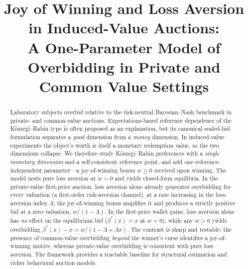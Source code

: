 \documentclass[11pt,a4paper]{article}
\title{\textbf{Joy of Winning and Loss Aversion in Induced-Value Auctions:\\
A One-Parameter Model of Overbidding in Private and Common Value Settings}}
\author{}
\date{}
\theoremstyle{remark}
\begin{document}
\maketitle
\begin{abstract}
\noindent
Laboratory subjects overbid relative to the risk-neutral Bayesian--Nash benchmark
in private- and common-value auctions. Expectations-based reference dependence of
the K\H{o}szegi--Rabin type is often proposed as an explanation, but its canonical
sealed-bid formulation separates a \emph{good} dimension from a \emph{money}
dimension. In induced-value experiments the object's worth is itself a monetary
redemption value, so the two dimensions collapse. We therefore study
K\H{o}szegi--Rabin preferences with a \emph{single monetary dimension} and a
self-consistent reference point, and add one reference-independent
parameter---a joy-of-winning bonus $w\ge0$ received upon winning. The model nests
pure loss aversion at $w=0$ and yields closed-form equilibria. In the private-value
first-price auction, loss aversion alone already generates overbidding for every
valuation (a first-order risk-aversion channel), at a rate increasing in the
loss-aversion index $\Lambda$; the joy-of-winning bonus amplifies it and produces a
strictly positive bid at a zero valuation, $w/(1-\Lambda)$. In the first-price
wallet game, loss aversion alone has \emph{no} effect on the equilibrium bid
($\beta^*(x)=x$ at $w=0$), while any $w>0$ yields overbidding
$\beta^*(x)-x=w/(1-\Lambda+\Lambda x)$. The contrast is sharp and testable: the
presence of common-value overbidding \emph{beyond} the winner's curse identifies a
joy-of-winning motive, whereas private-value overbidding is consistent with pure
loss aversion. The framework provides a tractable baseline for structural
estimation and richer behavioral auction models.
\end{abstract}
\end{document}
